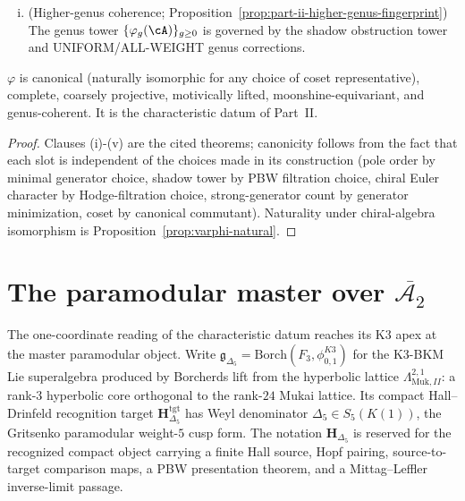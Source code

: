 \begin{theorem}
\begin{enumerate}[(i)]
 to $194$ twining fingerprints indexed by
 $\mathrm{Conj}(\mathrm{Monster})$, with frame shapes equal to
 bar Euler characters.
 \item \textup{(}Higher-genus coherence;
 Proposition~\ref{prop:part-ii-higher-genus-fingerprint}\textup{)}
 The genus tower $\{\varphi_g(\cA)\}_{g \ge 0}$ is governed by
 the shadow obstruction tower and UNIFORM/ALL-WEIGHT genus
 corrections.
\end{enumerate}
$\varphi$ is canonical \textup{(}naturally isomorphic for any
choice of coset representative\textup{)}, complete, coarsely
projective, motivically lifted, moonshine-equivariant, and
genus-coherent. It is the characteristic datum of Part~II.
\end{theorem}

\begin{proof}
Clauses (i)-(v) are the cited theorems; canonicity follows from
the fact that each slot is independent of the choices made in
its construction (pole order by minimal generator choice, shadow
tower by PBW filtration choice, chiral Euler character by
Hodge-filtration choice, strong-generator count by generator
minimization, coset by canonical commutant). Naturality under
chiral-algebra isomorphism is Proposition~\ref{prop:varphi-natural}.
\end{proof}

\section{The paramodular master over $\overline{\mathcal A_2}$}
\label{sec:part-ii-paramodular-master}

The one-coordinate reading of the characteristic datum reaches its
K3 apex at the master paramodular object. Write
$\mathfrak g_{\Delta_5} = \mathrm{Borch}(F_3,\phi^{K3}_{0,1})$ for
the K3-BKM Lie superalgebra produced by Borcherds lift from the
hyperbolic lattice $\Lambda_{\mathrm{Muk},II}^{2,1}$: a rank-$3$
hyperbolic core orthogonal to the rank-$24$ Mukai lattice. Its
compact Hall--Drinfeld recognition target
\(\mathbf H_{\Delta_5}^{\mathrm{tgt}}\) has Weyl denominator
\(\Delta_5 \in S_5(K(1))\), the Gritsenko paramodular weight-$5$
cusp form.  The notation \(\mathbf H_{\Delta_5}\) is reserved for the
recognized compact object carrying a finite Hall source, Hopf pairing,
source-to-target comparison maps, a PBW presentation theorem, and a
Mittag--Leffler inverse-limit passage.

